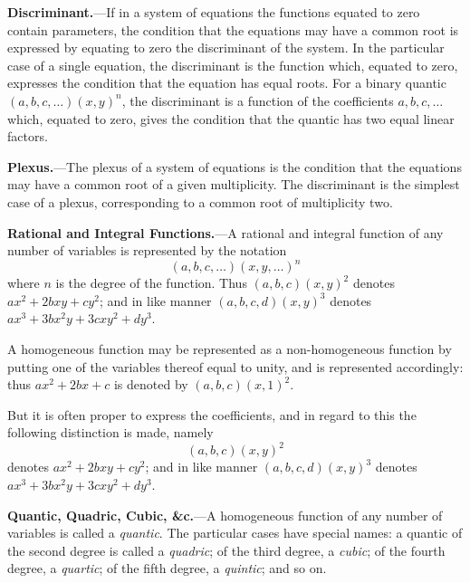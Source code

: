 \documentclass[11pt,a4paper]{book}
\begin{document}
\vspace{1em}

\noindent\textbf{Discriminant.}---If in a system of equations the functions equated to zero contain parameters, the condition that the equations may have a common root is expressed by equating to zero the discriminant of the system. In the particular case of a single equation, the discriminant is the function which, equated to zero, expresses the condition that the equation has equal roots. For a binary quantic $(a, b, c, \ldots)(x, y)^n$, the discriminant is a function of the coefficients $a, b, c, \ldots$ which, equated to zero, gives the condition that the quantic has two equal linear factors.

\vspace{1em}

\noindent\textbf{Plexus.}---The plexus of a system of equations is the condition that the equations may have a common root of a given multiplicity. The discriminant is the simplest case of a plexus, corresponding to a common root of multiplicity two.

\vspace{1em}

\noindent\textbf{Rational and Integral Functions.}---A rational and integral function of any number of variables is represented by the notation
\[
(a, b, c, \ldots)(x, y, \ldots)^n
\]
where $n$ is the degree of the function. Thus $(a, b, c)(x, y)^2$ denotes $ax^2 + 2bxy + cy^2$; and in like manner $(a, b, c, d)(x, y)^3$ denotes $ax^3 + 3bx^2y + 3cxy^2 + dy^3$.

A homogeneous function may be represented as a non-homogeneous function by putting one of the variables thereof equal to unity, and is represented accordingly: thus $ax^2 + 2bx + c$ is denoted by $(a, b, c)(x, 1)^2$.

But it is often proper to express the coefficients, and in regard to this the following distinction is made, namely
\[
(a, b, c)(x, y)^2
\]
denotes $ax^2 + 2bxy + cy^2$; and in like manner $(a, b, c, d)(x, y)^3$ denotes $ax^3 + 3bx^2y + 3cxy^2 + dy^3$.

\vspace{1em}

\noindent\textbf{Quantic, Quadric, Cubic, \&c.}---A homogeneous function of any number of variables is called a \textit{quantic}. The particular cases have special names: a quantic of the second degree is called a \textit{quadric}; of the third degree, a \textit{cubic}; of the fourth degree, a \textit{quartic}; of the fifth degree, a \textit{quintic}; and so on.
\end{document}
